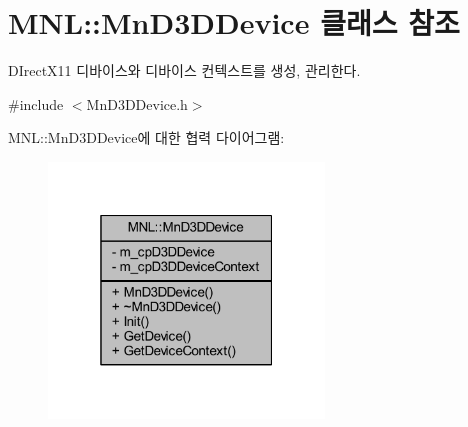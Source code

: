 \hypertarget{class_m_n_l_1_1_mn_d3_d_device}{}\section{M\+NL\+:\+:Mn\+D3\+D\+Device 클래스 참조}
\label{class_m_n_l_1_1_mn_d3_d_device}


D\+Irect\+X11 디바이스와 디바이스 컨텍스트를 생성, 관리한다.  




{\ttfamily \#include $<$Mn\+D3\+D\+Device.\+h$>$}



M\+NL\+:\+:Mn\+D3\+D\+Device에 대한 협력 다이어그램\+:\nopagebreak
\begin{figure}[H]
\begin{center}
\leavevmode
\includegraphics[width=208pt]{class_m_n_l_1_1_mn_d3_d_device__coll__graph}
\end{center}
\end{figure}
